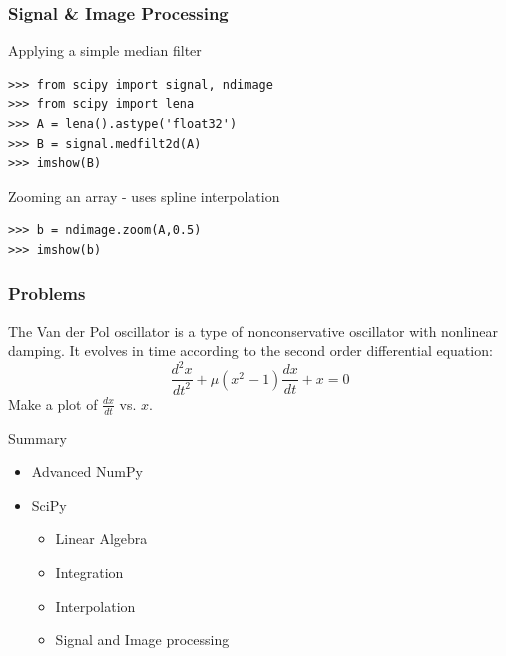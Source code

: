 \documentclass[14pt,compress]{beamer}
\newcounter{time}
\newcommand{\inctime}[1]{\addtocounter{time}{#1}{\tiny \thetime\ m}}
\begin{document}
\begin{frame}[fragile]
  \frametitle{Signal \& Image Processing}
  Applying a simple median filter
  \begin{lstlisting}
>>> from scipy import signal, ndimage
>>> from scipy import lena
>>> A = lena().astype('float32')
>>> B = signal.medfilt2d(A)
>>> imshow(B)
  \end{lstlisting}
  Zooming an array - uses spline interpolation
  \begin{lstlisting}
>>> b = ndimage.zoom(A,0.5)
>>> imshow(b)
  \end{lstlisting}
    \inctime{5}
\end{frame}

\begin{frame}[fragile]
  \frametitle{Problems}
  The Van der Pol oscillator is a type of nonconservative oscillator with nonlinear damping. It evolves in time according to the second order differential equation:
  \begin{equation*}
  \frac{d^2x}{dt^2}+\mu(x^2-1)\frac{dx}{dt}+x= 0
  \end{equation*}
  Make a plot of $\frac{dx}{dt}$ vs. $x$.
\inctime{30}
\end{frame}
\begin{frame}{Summary}
  \begin{itemize}
    \item Advanced NumPy
    \item SciPy
      \begin{itemize}
        \item Linear Algebra
        \item Integration
        \item Interpolation
        \item Signal and Image processing
      \end{itemize}
  \end{itemize}
\end{frame}
\end{document}
